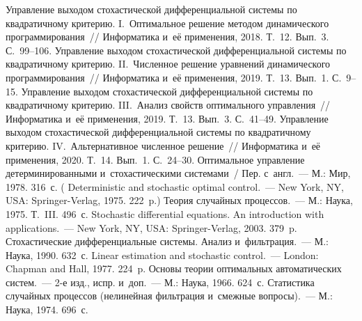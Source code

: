 \begin{multicols}{2}
{\small\frenchspacing
 {%
 \begin{thebibliography}{99}

 Управление выходом 
стохастической дифференциальной системы по квад\-ра\-тич\-но\-му 
критерию. I.~Оптимальное решение методом динамического 
программирования~// Информатика и~её применения, 2018. Т.~12. 
Вып.~3. С.~99--106.
 Управление выходом 
стохастической дифференциальной системы по квад\-ра\-тич\-но\-му 
критерию. II.~Численное решение уравнений динамического 
программирования~// Информатика и~её применения, 2019. Т.~13. 
Вып.~1. С.~9--15.
 Управление выходом 
стохастической дифференциальной системы по квад\-ра\-тич\-но\-му 
критерию. III.~Анализ свойств оптимального управления~// 
Информатика и~её применения, 2019. Т.~13. Вып.~3. С.~41--49.
 Управление выходом стохастической 
дифференциальной системы по квад\-ра\-тич\-но\-му критерию. 
IV.~Альтернативное чис\-лен\-ное решение~// Информатика и~её 
применения, 2020. Т.~14. Вып.~1. С.~24--30.
 Оптимальное управление 
детерминированными и~стохастическими системами~/ Пер. с~англ.~--- 
М.: Мир, 1978. 316~с. ( Deterministic 
and stochastic optimal control.~--- New York, NY, USA: Springer-Verlag, 
1975. 222~p.)
 Теория случайных процессов.~--- М.: Наука, 1975. 
Т.~III. 496~с.
 Stochastic differential equations. An introduction 
with applications.~--- New York, NY, USA: Springer-Verlag, 2003. 379~p.
 Стохастические 
дифференциальные системы. Анализ и~фильтрация.~--- М.: Наука, 
1990. 632~с.
 Linear estimation and stochastic control.~--- London: 
Chapman and Hall, 1977. 224~p.
 Основы теории оптимальных автоматических 
систем.~--- 2-е изд., испр. и~доп.~--- М.: Наука, 1966. 624~с.
 Статистика случайных процессов 
(нелинейная фильтрация и~смежные вопросы).~--- М.: Наука, 1974. 
696~с.

\end{thebibliography}

 }
 }

\end{multicols}

